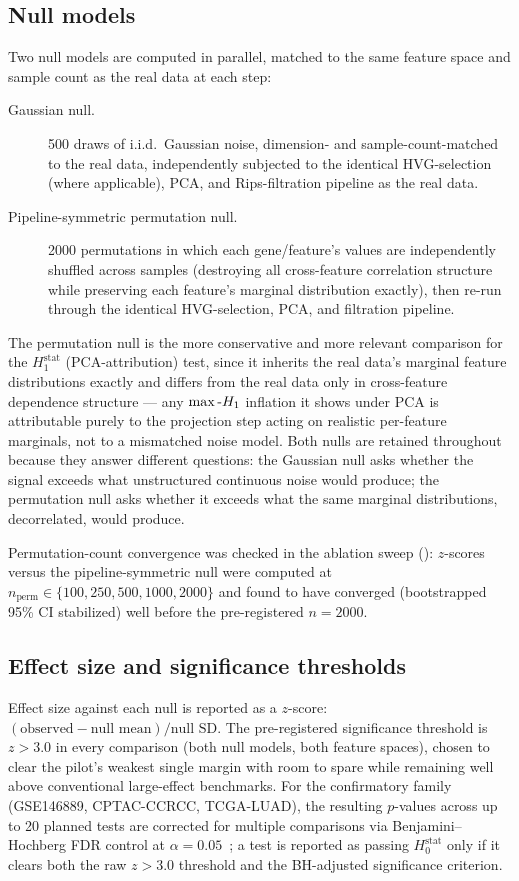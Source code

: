 \subsection{Null models}

Two null models are computed in parallel, matched to the same feature space and sample count as the real data at each step:

\begin{description}
\item[Gaussian null.] 500 draws of i.i.d.\ Gaussian noise, dimension- and sample-count-matched to the real data, independently subjected to the identical HVG-selection (where applicable), PCA, and Rips-filtration pipeline as the real data.
\item[Pipeline-symmetric permutation null.] 2000 permutations in which each gene/feature's values are independently shuffled across samples (destroying all cross-feature correlation structure while preserving each feature's marginal distribution exactly), then re-run through the identical HVG-selection, PCA, and filtration pipeline.
\end{description}

The permutation null is the more conservative and more relevant comparison for the $H_1^{\text{stat}}$ (PCA-attribution) test, since it inherits the real data's marginal feature distributions exactly and differs from the real data only in cross-feature dependence structure --- any $\max\text{-}H_1$ inflation it shows under PCA is attributable purely to the projection step acting on realistic per-feature marginals, not to a mismatched noise model. Both nulls are retained throughout because they answer different questions: the Gaussian null asks whether the signal exceeds what unstructured continuous noise would produce; the permutation null asks whether it exceeds what the same marginal distributions, decorrelated, would produce.

Permutation-count convergence was checked in the ablation sweep (): $z$-scores versus the pipeline-symmetric null were computed at $n_{\text{perm}} \in \{100, 250, 500, 1000, 2000\}$ and found to have converged (bootstrapped 95\% CI stabilized) well before the pre-registered $n=2000$.

\subsection{Effect size and significance thresholds}

Effect size against each null is reported as a $z$-score: $(\text{observed} - \text{null mean})/\text{null SD}$. The pre-registered significance threshold is $z>3.0$ in every comparison (both null models, both feature spaces), chosen to clear the pilot's weakest single margin with room to spare while remaining well above conventional large-effect benchmarks. For the confirmatory family (GSE146889, CPTAC-CCRCC, TCGA-LUAD), the resulting $p$-values across up to 20 planned tests are corrected for multiple comparisons via Benjamini--Hochberg FDR control at $\alpha=0.05$~\cite{benjaminihochberg1995}; a test is reported as passing $H_0^{\text{stat}}$ only if it clears both the raw $z>3.0$ threshold and the BH-adjusted significance criterion.

